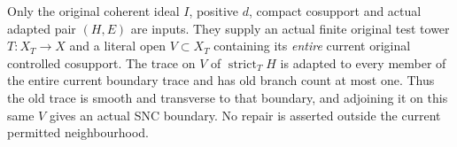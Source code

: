 \begin{theorem}
\label{hir:nc-original-finite-permitted-count-prephase}
\leanok
Only the original coherent ideal $I$, positive $d$, compact cosupport and
actual adapted pair $(H,E)$ are inputs. They supply an actual finite
original test tower $T:X_T\to X$ and a literal open $V\subset X_T$
containing its \emph{entire} current original controlled cosupport. The
trace on $V$ of $\operatorname{strict}_T H$ is adapted to every member
of the entire current boundary trace and has old branch count at most
one. Thus the old trace is smooth and transverse to that boundary, and
adjoining it on this same $V$ gives an actual SNC boundary. No repair is
asserted outside the current permitted neighbourhood.
\end{theorem}
